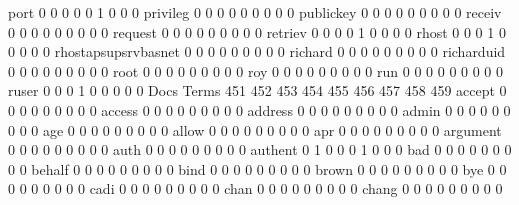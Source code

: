 \documentclass[compress,8pt]{beamer}
\begin{document}
\begin{frame}
\begin{Schunk}
  port                                       0   0   0   0   0   1   0   0   0
  privileg                                   0   0   0   0   0   0   0   0   0
  publickey                                  0   0   0   0   0   0   0   0   0
  receiv                                     0   0   0   0   0   0   0   0   0
  request                                    0   0   0   0   0   0   0   0   0
  retriev                                    0   0   0   0   1   0   0   0   0
  rhost                                      0   0   0   1   0   0   0   0   0
  rhostapsupsrvbasnet                        0   0   0   0   0   0   0   0   0
  richard                                    0   0   0   0   0   0   0   0   0
  richarduid                                 0   0   0   0   0   0   0   0   0
  root                                       0   0   0   0   0   0   0   0   0
  roy                                        0   0   0   0   0   0   0   0   0
  run                                        0   0   0   0   0   0   0   0   0
  ruser                                      0   0   0   1   0   0   0   0   0
                                          Docs
Terms                                      451 452 453 454 455 456 457 458 459
  accept                                     0   0   0   0   0   0   0   0   0
  access                                     0   0   0   0   0   0   0   0   0
  address                                    0   0   0   0   0   0   0   0   0
  admin                                      0   0   0   0   0   0   0   0   0
  age                                        0   0   0   0   0   0   0   0   0
  allow                                      0   0   0   0   0   0   0   0   0
  apr                                        0   0   0   0   0   0   0   0   0
  argument                                   0   0   0   0   0   0   0   0   0
  auth                                       0   0   0   0   0   0   0   0   0
  authent                                    0   1   0   0   0   1   0   0   0
  bad                                        0   0   0   0   0   0   0   0   0
  behalf                                     0   0   0   0   0   0   0   0   0
  bind                                       0   0   0   0   0   0   0   0   0
  brown                                      0   0   0   0   0   0   0   0   0
  bye                                        0   0   0   0   0   0   0   0   0
  cadi                                       0   0   0   0   0   0   0   0   0
  chan                                       0   0   0   0   0   0   0   0   0
  chang                                      0   0   0   0   0   0   0   0   0

\end{Schunk}
\end{frame}
\end{document}
